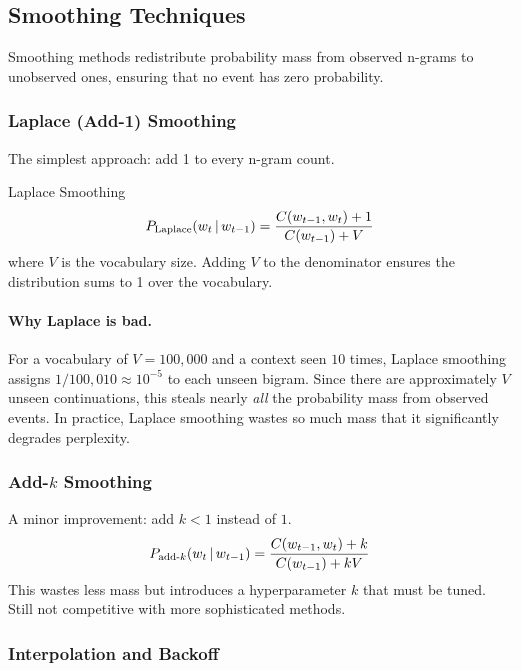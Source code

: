 \subsection{Smoothing Techniques}

Smoothing methods redistribute probability mass from observed n-grams to
unobserved ones, ensuring that no event has zero probability.

\subsubsection{Laplace (Add-1) Smoothing}

The simplest approach: add 1 to every n-gram count.

\begin{mathresult}{Laplace Smoothing}
\begin{equation}
P_{\text{Laplace}}(w_t \,|\, w_{t-1})
= \frac{C(w_{t-1}, w_t) + 1}{C(w_{t-1}) + V}
\label{eq:laplace}
\end{equation}
where $V$ is the vocabulary size.  Adding $V$ to the denominator ensures the
distribution sums to 1 over the vocabulary.
\end{mathresult}

\paragraph{Why Laplace is bad.}
For a vocabulary of $V = 100{,}000$ and a context seen $10$ times, Laplace
smoothing assigns $1/100{,}010 \approx 10^{-5}$ to each unseen bigram.
Since there are approximately $V$ unseen continuations, this steals nearly
\emph{all} the probability mass from observed events.  In practice, Laplace
smoothing wastes so much mass that it significantly degrades perplexity.

\subsubsection{Add-$k$ Smoothing}

A minor improvement: add $k < 1$ instead of $1$.
\begin{equation}
P_{\text{add-}k}(w_t \,|\, w_{t-1})
= \frac{C(w_{t-1}, w_t) + k}{C(w_{t-1}) + kV}
\label{eq:addk}
\end{equation}
This wastes less mass but introduces a hyperparameter $k$ that must be tuned.
Still not competitive with more sophisticated methods.

\subsubsection{Interpolation and Backoff}

